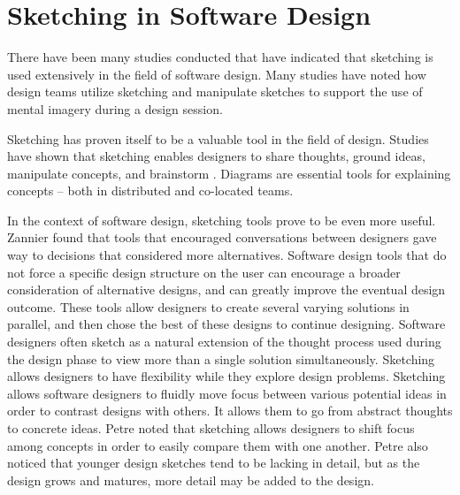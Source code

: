 \section{Sketching in Software Design}

There have been many studies conducted that have indicated that sketching is used extensively in the field of software design\cite{dekel}. Many studies have noted how design teams utilize sketching and manipulate sketches to support the use of mental imagery during a design session\cite{dekel}\cite{petre}.

Sketching has proven itself to be a valuable tool in the field of design. Studies have shown that sketching enables designers to share thoughts, ground ideas, manipulate concepts, and brainstorm \cite{cherubini}. Diagrams are essential tools for explaining concepts -- both in distributed and co-located teams\cite{yatani}.

In the context of software design, sketching tools prove to be even more useful. Zannier found that tools that encouraged conversations between designers gave way to decisions that considered more alternatives\cite{zannier}. Software design tools that do not force a specific design structure on the user can encourage a broader consideration of alternative designs, and can greatly improve the eventual design outcome\cite{zannier}. These tools allow designers to create several varying solutions in parallel, and then chose the best of these designs to continue designing. Software designers often sketch as a natural extension of the thought process used during the design phase to view more than a single solution simultaneously\cite{petre}. Sketching allows designers to have flexibility while they explore design problems. Sketching allows software designers to fluidly move focus between various potential ideas in order to contrast designs with others. It allows them to go from abstract thoughts to concrete ideas. Petre noted that sketching allows designers to shift focus among concepts in order to easily compare them with one another\cite{petre}. Petre also noticed that younger design sketches tend to be lacking in detail, but as the design grows and matures, more detail may be added to the design.







